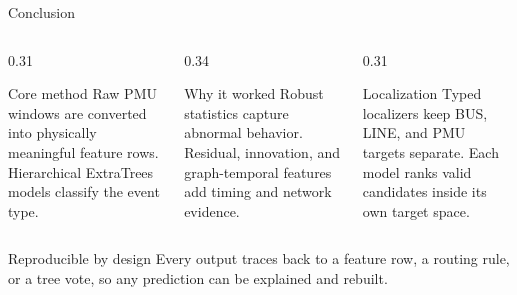 \documentclass[aspectratio=169,10pt,t]{beamer}
\begin{document}
\begin{frame}{Conclusion}
\small
\begin{columns}[T,totalwidth=\textwidth]
\begin{column}{0.31\textwidth}
\begin{exampleblock}{Core method}
Raw PMU windows are converted into physically meaningful feature rows. Hierarchical ExtraTrees models classify the event type.
\end{exampleblock}
\end{column}
\begin{column}{0.34\textwidth}
\begin{exampleblock}{Why it worked}
Robust statistics capture abnormal behavior. Residual, innovation, and graph-temporal features add timing and network evidence.
\end{exampleblock}
\end{column}
\begin{column}{0.31\textwidth}
\begin{exampleblock}{Localization}
Typed localizers keep BUS, LINE, and PMU targets separate. Each model ranks valid candidates inside its own target space.
\end{exampleblock}
\end{column}
\end{columns}
\vspace{2mm}
\begin{alertblock}{Reproducible by design}
Every output traces back to a feature row, a routing rule, or a tree vote, so any prediction can be explained and rebuilt.
\end{alertblock}
\end{frame}
\end{document}
